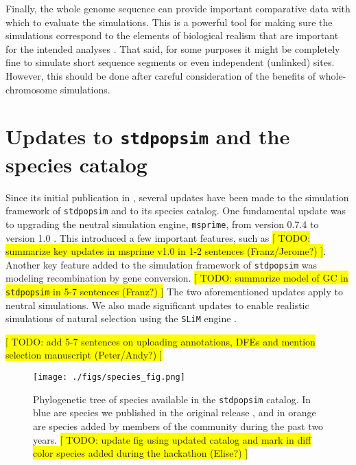 \documentclass{article}
\newcommand{\stdpopsim}{\texttt{stdpopsim}\xspace}
\begin{document}
Finally, the whole genome sequence can provide important comparative
data with which to evaluate the simulations. This is a powerful tool for
making sure the simulations correspond to the elements of biological
realism that are important for the intended analyses \citep{Hsieh2016a}. 
%
That said, for some purposes it might be completely fine to simulate short sequence
segments or even independent (unlinked) sites. However, this should be done after
careful consideration  of the benefits of whole-chromosome simulations.


\hypertarget{sec3}{%
	\section*{Updates to \texttt{\stdpopsim} and the species catalog}\label{sec:expanded-catalog}}

Since its initial publication in \cite{Adrion2020}, several updates have been made to  the simulation framework of \texttt{\stdpopsim} and to its species catalog. One fundamental update was to upgrading the neutral simulation engine, \texttt{msprime}, from version 0.7.4 to version 1.0 \citep{Baumdicker2022}. This introduced a few important features, such as %
\colorbox{yellow}{[ TODO: summarize key updates in msprime v1.0 in 1-2 sentences (Franz/Jerome?) ]}.
%
Another key feature added to the simulation framework of \texttt{\stdpopsim} was modeling recombination by gene conversion. %
\colorbox{yellow}{[ TODO: summarize model of GC in \stdpopsim in 5-7 sentences (Franz?) ]}
%
The two aforementioned updates apply to neutral simulations. We also made significant updates to enable realistic simulations of natural selection using the \texttt{SLiM} engine \citep{Haller2019}. %

\colorbox{yellow}{[ TODO: add 5-7 sentences on uploading annotations, DFEs and mention selection manuscript (Peter/Andy?) ]}
%



\begin{figure}
	\texttt{[image: ./figs/species\_fig.png]}
	\caption{Phylogenetic tree of species available in the \texttt{\stdpopsim} catalog. 
		In blue are species we published in the original release \citep{Adrion2020}, and in orange are species added by members of the community during the past two years. 
		\colorbox{yellow}{[ TODO: update fig using updated catalog and mark in diff color species added during the hackathon (Elise?) ]}}
	\label{fig:tree}
\end{figure}
\end{document}
